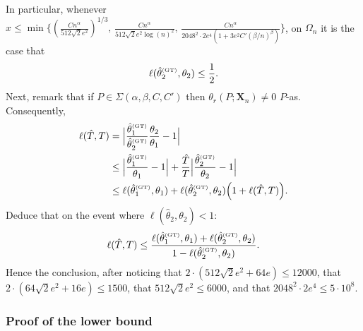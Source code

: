 \documentclass{article}
\newcommand{\1}{\boldsymbol{1}}
\theoremstyle{plain}
\begin{document}
  In particular, whenever $x \leq \min\{(\frac{Cn^{\alpha}}{512\sqrt{2}e^2})^{1/3},\, \frac{Cn^{\alpha}}{512\sqrt{2}e^2\log(n)^2},\, \frac{Cn^{\alpha}}{2048^2\cdot 2e^4(1+3e^2C'(\beta/n)^{\beta})} \}$, on $\Omega_n$ it is the case that
  \begin{align*}
    \ell(\hat{\theta}_2^{\text{\tiny{(GT)}}},\theta_2)%
    \leq \frac{1}{2}.
  \end{align*}
  Next, remark that if $P \in \Sigma(\alpha,\beta,C,C')$ then $\theta_r(P;\mathbf{X}_n) \ne 0$ $P$-as. Consequently,
\begin{align*}
  \ell(\hat{T},T)%
  &=%
    \Big|\frac{\hat{\theta}_1^{\text{\tiny{(GT)}}}}{\hat{\theta}_2^{\text{\tiny{(GT)}}}}\frac{\theta_2}{\theta_1} - 1 \Big|\\%
  &\leq \Big|\frac{\hat{\theta}_1^{\text{\tiny{(GT)}}}}{\theta_1} - 1 \Big|%
    + \frac{\hat{T}}{T}\Big|\frac{\hat{\theta}_2^{\text{\tiny{(GT)}}}}{\theta_2} - 1 \Big|\\
  &\leq \ell(\hat{\theta}_1^{\text{\tiny{(GT)}}},\theta_1)%
    + \ell(\hat{\theta}_2^{\text{\tiny{(GT)}}},\theta_2)\Big(1 + \ell(\hat{T},T)\Big).
\end{align*}
Deduce that on the event where $\ell(\hat\theta_2,\theta_2) < 1$:
\begin{equation*}
  \ell(\hat{T},T)%
  \leq\frac{\ell(\hat{\theta}_1^{\text{\tiny{(GT)}}},\theta_1) + \ell(\hat{\theta}_2^{\text{\tiny{(GT)}}},\theta_2)}{1 - \ell(\hat{\theta}_2^{\text{\tiny{(GT)}}},\theta_2)}.
\end{equation*}
Hence the conclusion, after noticing that $2\cdot(512\sqrt{2}e^2 + 64 e) \leq 12000$, that $2\cdot(64\sqrt{2}e^2 + 16e) \leq 1500$, that $512\sqrt{2}e^2 \leq 6000$, and that $2048^2\cdot 2e^4 \leq 5\cdot 10^8$.


\subsubsection{Proof of the lower bound}
\label{sec:proof-lower-bound}
\end{document}
